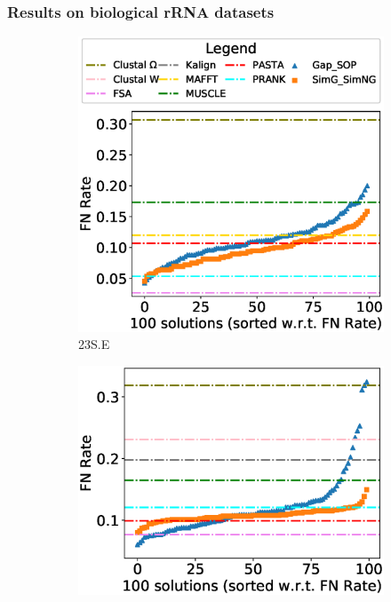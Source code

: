 \subsubsection{Results on biological rRNA datasets}
\begin{figure}[!htbp]
	\centering
	\begin{adjustwidth}{-0.5cm}{-0.5cm}
		\begin{subfigure}[b]{0.25\textwidth}
			\includegraphics[width=\columnwidth]{Figure/summary/precomputedInit/23S.E/fnrate_density_single_run}
			\caption{23S.E}
		\end{subfigure}    
		\begin{subfigure}[b]{0.25\textwidth}
			\includegraphics[width=\columnwidth]{Figure/summary/precomputedInit/23S.E.aa_ag/fnrate_density_single_run}

\end{subfigure}
\end{adjustwidth}
\end{figure}

